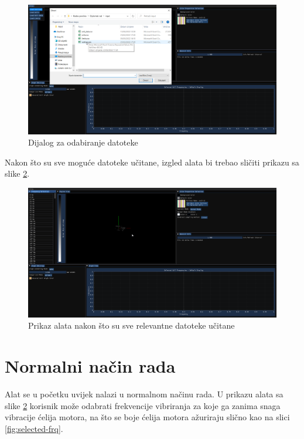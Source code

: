\documentclass[times, utf8, diplomski]{fer}
\begin{document}
\begin{figure} [H]
	\centering
    \includegraphics[width=\textwidth]{demonstration/file_select_dialog.png}
    \caption{Dijalog za odabiranje datoteke}
    \label{fig:file-dialog}
\end{figure}

Nakon što su sve moguće datoteke učitane, izgled alata bi trebao sličiti prikazu sa slike \ref{fig:loaded-files-tool}.

\begin{figure} [H]
	\centering
    \includegraphics[width=\textwidth]{demonstration/files_loaded_screenshot.png}
    \caption{Prikaz alata nakon što su sve relevantne datoteke učitane}
    \label{fig:loaded-files-tool}
\end{figure}

\section{Normalni način rada}

Alat se u početku uvijek nalazi u normalnom načinu rada. U prikazu alata sa slike \ref{fig:loaded-files-tool} korisnik može odabrati frekvencije vibriranja za koje ga zanima snaga vibracije ćelija motora, na što se boje ćelija motora ažuriraju slično kao na slici \ref{fig:selected-frq}.
\end{document}
